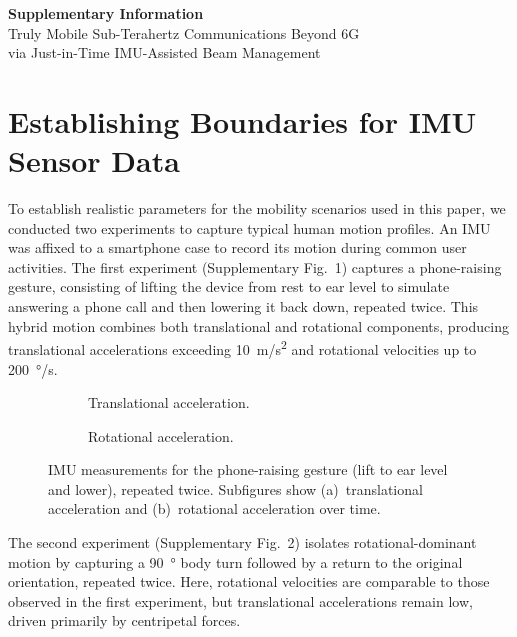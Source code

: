 \documentclass[fleqn,10pt]{article}
\begin{document}
\vspace*{\fill}
\begin{center}
{\LARGE\bfseries Supplementary Information}\\[12pt]
{\large Truly Mobile Sub-Terahertz Communications Beyond 6G\\[4pt]via Just-in-Time IMU-Assisted Beam Management}
\end{center}
\vspace*{\fill}

\newpage


\section*{Establishing Boundaries for IMU Sensor Data}
To establish realistic parameters for the mobility scenarios used in this paper, we conducted two experiments to capture typical human motion profiles. An IMU was affixed to a smartphone case to record its motion during common user activities. The first experiment (Supplementary Fig.~1) captures a phone-raising gesture, consisting of lifting the device from rest to ear level to simulate answering a phone call and then lowering it back down, repeated twice. This hybrid motion combines both translational and rotational components, producing translational accelerations exceeding \SI{10}{m/s^2} and rotational velocities up to \SI{200}{\degree/s}.

\begin{figure}[h!]
    \centering
    \begin{subfigure}{0.99\linewidth}
        \centering
        
        \vspace{-34pt}
        \caption{Translational acceleration.}
    \end{subfigure}

    \begin{subfigure}{0.99\linewidth}
        \centering
        
        \vspace{-34pt}
        \caption{Rotational acceleration.}
    \end{subfigure}
    \caption{IMU measurements for the phone-raising gesture (lift to ear level and lower), repeated twice. Subfigures show (a)~translational acceleration and (b)~rotational acceleration over time.}
    \vspace{-5pt}
\end{figure}

The second experiment (Supplementary Fig.~2) isolates rotational-dominant motion by capturing a \SI{90}{\degree} body turn followed by a return to the original orientation, repeated twice. Here, rotational velocities are comparable to those observed in the first experiment, but translational accelerations remain low, driven primarily by centripetal forces.
\end{document}
